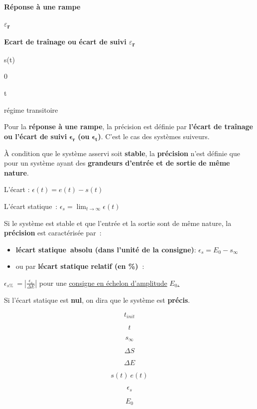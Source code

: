 \textbf{Réponse à une rampe}

\textbf{$\varepsilon$\textsubscript{r}}

\textbf{Ecart de traînage ou écart de suivi $\varepsilon$\textsubscript{r}}

s(t)

0

t

régime transitoire

Pour la \textbf{réponse à une rampe}, la précision est définie par
\textbf{l'écart de traînage ou l'écart de suivi}
\(\mathbf{\epsilon}_{\mathbf{r}}\) \textbf{(ou}
\(\mathbf{\epsilon}_{\mathbf{t}}\)\textbf{)}. C'est le cas des systèmes
suiveurs.

À condition que le système asservi soit \textbf{stable}, la
\textbf{précision} n'est définie que pour un système ayant des
\textbf{grandeurs d'entrée et de sortie} \textbf{de même nature}.

L'écart : \(\epsilon(t) = e(t) - s(t)\)

L'écart statique~:
\(\epsilon_{s} = \lim_{t \rightarrow \infty}{\epsilon(t)}\)

Si le système est stable et que l'entrée et la sortie sont de même
nature, la \textbf{précision} est caractérisée par~:

\begin{itemize}
\item
  \textbf{l\textquotesingle écart statique~absolu (dans l'unité de la
  consigne)}: \(\epsilon_{s} = E_{0} - s_{\infty}\)
\item
  ou par \textbf{l\textquotesingle écart statique relatif (en \%)~}:
\end{itemize}

\(\epsilon_{s\%}\  = \left| \frac{\epsilon_{s}}{\Delta E} \right|\) pour
une \ul{consigne en échelon d'amplitude} \(E_{0}\)\ul{.}

Si l'écart statique est \textbf{nul}, on dira que le système est
\textbf{précis}.

\[t_{init}\]

\[t\]

\[s_{\infty}\]

\[\Delta S\]

\[\Delta E\]

\[s(t)\ e(t)\]

\[\epsilon_{s}\]

\[E_{0}\]

